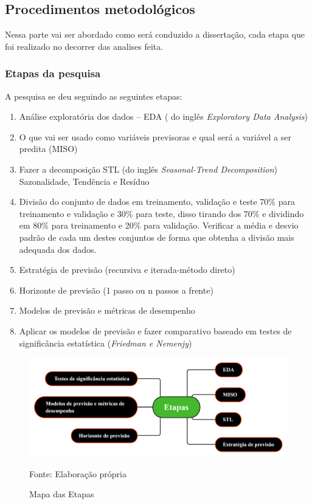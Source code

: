 \subsection{Procedimentos metodológicos} \label{subsec:metod}

Nessa parte vai ser abordado como será conduzido a dissertação, cada etapa que foi realizado no decorrer das analises feita.
   
    \subsubsection{Etapas da pesquisa}\label{subsubsec:etp}
    A pesquisa se deu seguindo as seguintes etapas:
    
    \begin{enumerate}[start=1, label = {\textbf{Etapa} \arabic* } ]
    	\item Análise exploratória dos dados – EDA ( do inglês \textit{Exploratory Data Analysis}) \label{etp:1}
    	\item O que vai ser usado como variáveis previsoras e qual será a variável a ser predita (MISO) \label{etp:2}
    	\item Fazer a decomposição STL (do inglês \textit{Seasonal-Trend Decomposition}) Sazonalidade, Tendência e Resíduo \label{etp:3}
    	\item Divisão do conjunto de dados em treinamento, validação e teste 70\% para treinamento e validação e 30\% para teste, disso tirando dos 70\% e dividindo em 80\% para treinamento e 20\% para validação. Verificar a média e desvio padrão de cada um destes conjuntos de forma que obtenha a divisão mais adequada dos dados. \label{etp:4}
    	\item Estratégia de previsão (recursiva e iterada-método direto) \label{etp:5}
    	\item Horizonte de previsão (1 passo ou n passos a frente) \label{etp:6}
    	\item Modelos de previsão e métricas de desempenho \label{etp:7}
    	\item Aplicar os modelos de previsão e fazer comparativo baseado em testes de significância estatística (\textit{Friedman e Nemenjy}) \label{etp:9}
    \end{enumerate}

\begin{figure}[H]
	\centering
	\caption{Mapa das Etapas}
	\label{fig:etapas}
	\includegraphics[width=1\linewidth]{Introducao/Figuras/Etapas}
	
	Fonte: Elaboração própria
\end{figure}




    